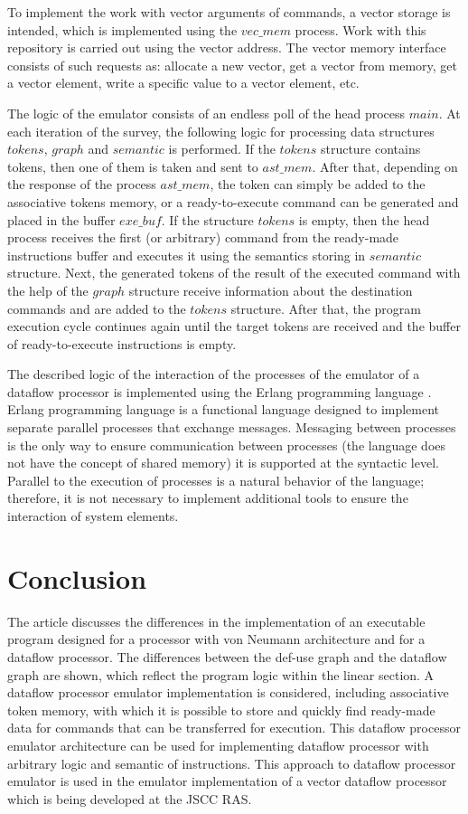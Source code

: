 \documentclass[
11pt,%
tightenlines,%
twoside,%
onecolumn,%
nofloats,%
nobibnotes,%
nofootinbib,%
superscriptaddress,%
noshowpacs,%
centertags]%
{revtex4}
\begin{document}
To implement the work with vector arguments of commands, a vector storage is intended, which is implemented using the $vec\_mem$ process.
Work with this repository is carried out using the vector address.
The vector memory interface consists of such requests as: allocate a new vector, get a vector from memory, get a vector element, write a specific value to a vector element, etc.

The logic of the emulator consists of an endless poll of the head process $main$.
At each iteration of the survey, the following logic for processing data structures $tokens$, $graph$ and $semantic$ is performed.
If the $tokens$ structure contains tokens, then one of them is taken and sent to $ast\_mem$.
After that, depending on the response of the process $ast\_mem$, the token can simply be added to the associative tokens memory, or a ready-to-execute command can be generated and placed in the buffer $exe\_buf$.
If the structure $tokens$ is empty, then the head process receives the first (or arbitrary) command from the ready-made instructions buffer and executes it using the semantics storing in $semantic$ structure.
Next, the generated tokens of the result of the executed command with the help of the $graph$ structure receive information about the destination commands and are added to the $tokens$ structure.
After that, the program execution cycle continues again until the target tokens are received and the buffer of ready-to-execute instructions is empty.

The described logic of the interaction of the processes of the emulator of a dataflow processor is implemented using the Erlang programming language \cite {Armstrong, Cesarini}.
Erlang programming language is a functional language designed to implement separate parallel processes that exchange messages.
Messaging between processes is the only way to ensure communication between processes (the language does not have the concept of shared memory) it is supported at the syntactic level.
Parallel to the execution of processes is a natural behavior of the language; therefore, it is not necessary to implement additional tools to ensure the interaction of system elements.

\section{Conclusion}

The article discusses the differences in the implementation of an executable program designed for a processor with von Neumann architecture and for a dataflow processor.
The differences between the def-use graph and the dataflow graph are shown, which reflect the program logic within the linear section.
A dataflow processor emulator implementation is considered, including associative token memory, with which it is possible to store and quickly find ready-made data for commands that can be transferred for execution.
This dataflow processor emulator architecture can be used for implementing dataflow processor with arbitrary logic and semantic of instructions.
This approach to dataflow processor emulator is used in the emulator implementation of a vector dataflow processor which is being developed at the JSCC RAS.
\end{document}
